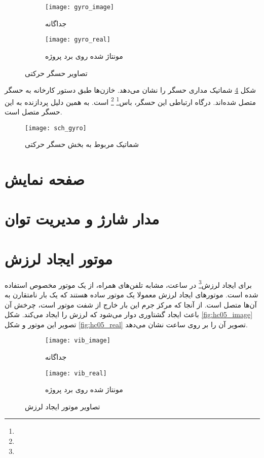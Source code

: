 \begin{figure}[h]
	\centering
	\begin{subfigure}{0.5\textwidth}
		\centering
		\texttt{[image: gyro\_image]}
		\caption{جداگانه}
		\label{fig:gyro_image}
	\end{subfigure}
	\begin{subfigure}{0.44\textwidth}
		\centering
		\texttt{[image: gyro\_real]}
		\caption{مونتاژ شده روی برد پروژه}
		\label{fig:gyro_real}
	\end{subfigure}
	\caption{تصاویر حسگر حرکتی}
\end{figure}

شکل \ref{fig:sch-gyro} شماتیک مداری حسگر  را نشان می‌دهد. خازن‌ها طبق دستور کارخانه به حسگر متصل شده‌اند. درگاه ارتباطی این حسگر، باس\footnote{}
 \footnote{}
  است. به همین دلیل  پردازنده به این حسگر متصل است.

\begin{figure}[h]
	\centering
	\texttt{[image: sch\_gyro]}
	\caption{شماتیک مربوط به بخش حسگر حرکتی}
	\label{fig:sch-gyro}
\end{figure}

\section{صفحه نمایش}

\section{مدار شارژ و مدیریت توان}

\section{موتور ایجاد لرزش}
برای ایجاد لرزش\footnote{} در ساعت، مشابه تلفن‌های همراه، از یک موتور مخصوص استفاده شده است. موتورهای ایجاد لرزش معمولا یک موتور  ساده هستند که یک بار نامتقارن به آن‌ها متصل است. از آنجا که مرکز جرم این بار خارج از شفت موتور است، چرخش آن باعث ایجاد گشتاوری دوار می‌شود که لرزش را ایجاد می‌کند. شکل \ref{fig:hc05_image} تصویر این موتور و شکل \ref{fig:hc05_real} تصویر آن را بر روی \pcbf ساعت نشان می‌دهد.

\begin{figure}[h]
	\centering
	\begin{subfigure}{0.35\textwidth}
		\centering
		\texttt{[image: vib\_image]}
		\caption{جداگانه}
		\label{fig:vib_image}
	\end{subfigure}
	\begin{subfigure}{0.44\textwidth}
		\centering
		\texttt{[image: vib\_real]}
		\caption{مونتاژ شده روی برد پروژه}
		\label{fig:vib_real}
	\end{subfigure}
	\caption{تصاویر موتور ایجاد لرزش}
\end{figure}

